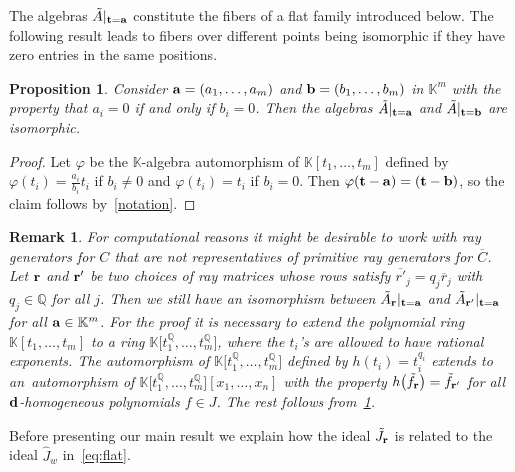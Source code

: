\documentclass[10pt,a4paper]{amsart}
\newcommand{\thlabel}[1]{\label{#1}}
\newcommand{\thref}[1]{\ref{#1}}
\newtheorem{Proposition}[Theorem]{Proposition}
\newtheorem{Remark}[Theorem]{Remark}}
\numberwithin{equation}{section}
\begin{document}
The algebras $\tilde A\vert_{{\bf t}={\bf a}}$ constitute the fibers of a flat family introduced below.
The following result leads to fibers over different points being isomorphic if they have zero entries in the same positions.

\begin{Proposition}\thlabel{prop:generic fibers}
Consider ${\bf a}=(a_1,\dots,a_m)$ and ${\bf b}=(b_1,\dots,b_m)$ in $\mathbb K^m$ with the property that $a_i=0$ if and only if $b_i=0$.
Then the algebras $\tilde A\vert_{{\bf t}={\bf a}}$ and $\tilde A\vert_{{\bf t}={\bf b}}$ are isomorphic.
\end{Proposition}
\begin{proof}
Let $\varphi$ be the $\mathbb K$-algebra automorphism of $\mathbb K[t_1,\dots,t_m]$ defined by $\varphi(t_i)=\frac{a_i}{b_i}t_i$ if $b_i\not =0$ and $\varphi(t_i)=t_i$ if $b_i=0$.
Then $\varphi({\bf t}-{\bf a})=({\bf t}-{\bf b})$, so the claim follows by~\thref{notation}.
\end{proof}

\begin{Remark}\thlabel{rmk:non primitive rays}
For computational reasons it might be desirable to work with ray generators for $C$ that are not representatives of primitive ray generators for $\overline{C}$.
Let ${\bf r}$ and ${\bf r'}$ be two choices of ray matrices whose rows satisfy $\overline{r'}_j=q_j\overline{r}_j$ with $q_j\in \mathbb Q$ for all $j$.
Then we still have an isomorphism between $\tilde A_{\bf r}\vert_{{\bf t}={\bf a}}$ and $\tilde A_{\bf r'}\vert_{{\bf t}={\bf a}}$ for all ${\bf a}\in \mathbb K^m$.
For the proof it is neces\-sary to extend the polynomial ring $\mathbb K[t_1,\dots,t_m]$ to a ring $\mathbb K\big[t_1^{\mathbb Q},\dots,t_m^{\mathbb Q}\big]$, where the $t_i$'s are allowed to have rational exponents.
The automorphism of $\mathbb K\big[t_1^{\mathbb Q},\dots,t_m^{\mathbb Q}\big]$ defined by $h(t_i)=t_i^{q_i}$ extends to an~auto\-morphism of $\mathbb K\big[t_1^{\mathbb Q},\dots,t_m^{\mathbb Q}\big][x_1,\dots,x_n]$ with the property $h\big(\tilde f_{\bf r}\big)=\tilde f_{\bf r'}$ for all ${\bf d}$-homogeneous polynomials $f\in J$.
The rest follows from~\thref{prop:generic fibers}.
\end{Remark}

Before presenting our main result we explain how the ideal $\tilde J_{\bf r}$ is related to the ideal $\hat J_w$ in~\eqref{eq:flat}.
\end{document}
